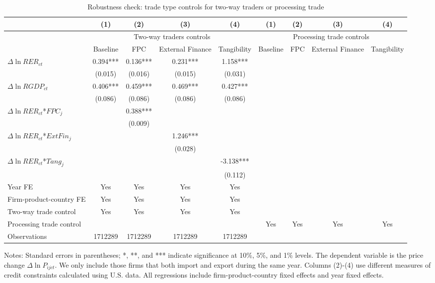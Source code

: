 \documentclass[12pt]{article}
\begin{document}
\begin{table}
	\centering
	\caption{Robustness check: trade type controls for two-way traders or processing trade}
	\begin{threeparttable}
		\begin{tabular}{lcccccccc}
			\toprule
			& (1)   & (2)   & (3)   & (4) & (1)   & (2)   & (3)   & (4)\\
			\midrule
			& \multicolumn{4}{c}{Two-way traders controls} & \multicolumn{4}{c}{Processing trade controls}\\
			& Baseline & FPC   & External Finance & Tangibility & Baseline & FPC   & External Finance & Tangibility\\
			\midrule
			$\Delta \ln RER_{ct}$ & 0.394*** & 0.136*** & 0.231*** & 1.158*** &&&&\\
			& (0.015) & (0.016) & (0.015) & (0.031) &&&&\\
			$\Delta \ln RGDP_{ct}$ & 0.406*** & 0.459*** & 0.469*** & 0.427*** &&&&\\
			& (0.086) & (0.086) & (0.086) & (0.086) &&&&\\
			$\Delta \ln RER_{ct}$*$FPC_{j}$ &       & 0.388*** &       &  &&&&\\
			&       & (0.009) &       &  &&&&\\
			$\Delta \ln RER_{ct}$*$ExtFin_{j}$ &       &       & 1.246*** &  &&&&\\
			&       &       & (0.028) &  &&&&\\
			$\Delta \ln RER_{ct}$*$Tang_{j}$ &       &       &       & -3.138*** &&&&\\
			&       &       &       & (0.112) &&&&\\
			Year FE  &  Yes   & Yes   & Yes   & Yes &&&&\\
			Firm-product-country FE &  Yes   & Yes   & Yes   & Yes &&&&\\
			Two-way trade control &  Yes   & Yes   & Yes   & Yes &&&&\\
			Processing trade control &&&& &  Yes   & Yes   & Yes   & Yes \\
			Observations & 1712289 & 1712289 & 1712289 & 1712289 &&&&\\
			\bottomrule
		\end{tabular}
		\begin{tablenotes}
			\footnotesize
			\item[Notes:] Standard errors in parentheses; *, **, and *** indicate significance at 10\%, 5\%, and 1\% levels. The dependent variable is the price change $\Delta \ln P_{ijct}$. We only include those firms that both import and export during the same year. Columns (2)-(4) use different measures of credit constraints calculated using U.S. data. All regressions include firm-product-country fixed effects and year fixed effects.
		\end{tablenotes}
	\end{threeparttable}
	\label{tab.robust.tradetype}
\end{table}
\end{document}
